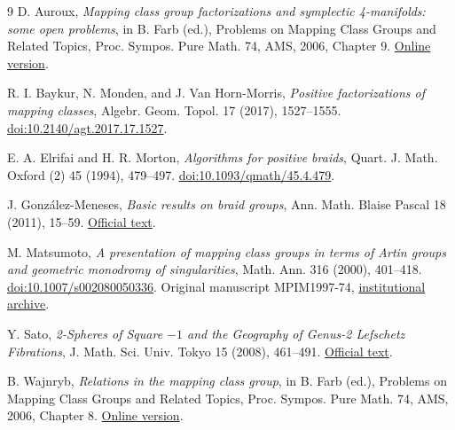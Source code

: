 \documentclass[11pt]{article}
\begin{document}
\begin{thebibliography}{9}
D. Auroux, \emph{Mapping class group factorizations and symplectic
4-manifolds: some open problems}, in B. Farb (ed.),
Problems on Mapping Class Groups and Related Topics,
Proc. Sympos. Pure Math. 74, AMS, 2006, Chapter 9.
\href{https://www.math.uchicago.edu/~farb/papers/mcgbook.pdf}{Online version}.

R. I. Baykur, N. Monden, and J. Van Horn-Morris,
\emph{Positive factorizations of mapping classes},
Algebr. Geom. Topol. 17 (2017), 1527--1555.
\href{https://doi.org/10.2140/agt.2017.17.1527}{doi:10.2140/agt.2017.17.1527}.

E. A. Elrifai and H. R. Morton,
\emph{Algorithms for positive braids},
Quart. J. Math. Oxford (2) 45 (1994), 479--497.
\href{https://doi.org/10.1093/qmath/45.4.479}{doi:10.1093/qmath/45.4.479}.

J. Gonz\'alez-Meneses,
\emph{Basic results on braid groups},
Ann. Math. Blaise Pascal 18 (2011), 15--59.
\href{https://www.numdam.org/article/AMBP_2011__18_1_15_0.pdf}{Official text}.

M. Matsumoto, \emph{A presentation of mapping class groups in terms
of Artin groups and geometric monodromy of singularities},
Math. Ann. 316 (2000), 401--418.
\href{https://doi.org/10.1007/s002080050336}{doi:10.1007/s002080050336}.
Original manuscript MPIM1997-74,
\href{https://archive.mpim-bonn.mpg.de/id/eprint/3423/}{institutional archive}.

Y. Sato, \emph{2-Spheres of Square \(-1\) and the Geography of
Genus-2 Lefschetz Fibrations},
J. Math. Sci. Univ. Tokyo 15 (2008), 461--491.
\href{https://www.ms.u-tokyo.ac.jp/journal/pdf/jms150403.pdf}{Official text}.

B. Wajnryb, \emph{Relations in the mapping class group},
in B. Farb (ed.), Problems on Mapping Class Groups and Related Topics,
Proc. Sympos. Pure Math. 74, AMS, 2006, Chapter 8.
\href{https://www.math.uchicago.edu/~farb/papers/mcgbook.pdf}{Online version}.
\end{thebibliography}
\end{document}
